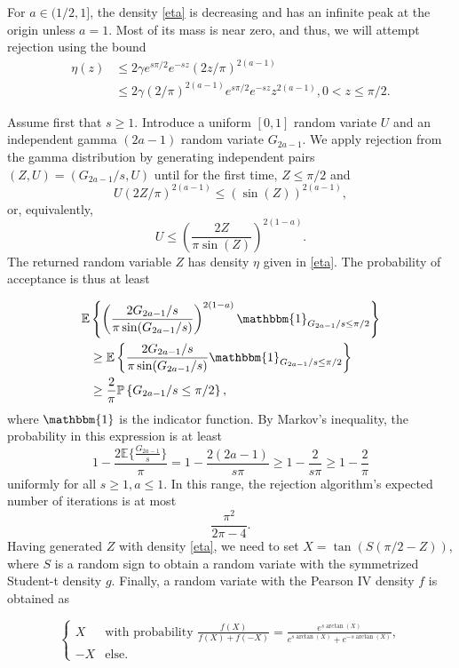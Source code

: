 \documentclass[12pt,reqno,tbtags]{amsart}
\newcommand{\I}{\mathbbm{1}}
\newcommand{\EXP}{\mathbb{E}}
\newcommand{\PROB}{\mathbb{P}}
\begin{document}
For $a \in (1/2,1]$,  the density \eqref{eta}
is decreasing and has an infinite peak at the origin unless $a=1$.
Most of its mass is near zero, and thus, we will attempt rejection using the bound
\begin{align*} 
\eta (z) &\le 2\gamma e^{s\pi/2} e^{-sz} (2z/\pi)^{2(a-1)}  \\
&\le 2\gamma (2/\pi)^{2(a-1)} e^{s\pi/2} e^{-sz} z^{2(a-1)} ,  0 < z \le \pi/2.
\end{align*}

Assume first that $s \ge 1$.
Introduce a uniform $[0,1]$ random variate $U$ and an independent  gamma $(2a-1)$
random variate $G_{2a-1}$.
We apply rejection from the gamma distribution by generating
independent pairs $(Z,U) = (G_{2a-1}/s , U)$ until for the first time,
$Z \le \pi/2$ and
$$
U  (2Z/\pi)^{2(a-1)} \le (\sin (Z))^{2(a-1)},
$$
or, equivalently,
$$
U \le \left( \frac{ 2Z }{ \pi \sin (Z)} \right)^{2(1-a)}.
$$
The returned random variable $Z$ has density $\eta$ given in \eqref{eta}.
The probability of acceptance is thus at least

\begin{align*} 
\EXP &\left\{ \left( \frac{ 2G_{2a-1}/s }{ \pi \sin (G_{2a-1}/s)} \right)^{2(1-a)}  \I_{G_{2a-1}/s \le \pi/2} \right\} \\
&\ge \EXP \left\{ \frac{ 2G_{2a-1}/s }{ \pi \sin (G_{2a-1}/s)}  \I_{G_{2a-1}/s \le \pi/2} \right\} \\
&\ge \frac{2 }{ \pi}  \PROB \left\{ G_{2a-1}/s \le \pi/2 \right\}, 
\end{align*}
where $\I$ is the indicator function. By Markov's inequality, the probability in this expression is at least
$$
1 - \frac{2 \EXP \{ \frac{G_{2a-1} }{ s} \} }{  \pi} = 1 - \frac{2 (2a-1) }{ s \pi}
\ge 1 - \frac{2 }{ s \pi} 
\ge 1 - \frac{2 }{ \pi} 
$$
uniformly for all $s \ge 1, a \le 1$. In this range, the rejection algorithm's expected number of iterations is at most 
$$
\frac{ \pi^2 }{ 2\pi - 4 }.
$$
Having generated $Z$ with density \eqref{eta}, we need to set 
$X = \tan ( S(\pi/2 -Z) )$, where $S$ is a random sign to obtain 
a random variate with the symmetrized Student-t density $g$.
Finally, a random variate with the Pearson IV density $f$ is obtained as

\begin{equation*}
\begin{cases}
X & \text{with probability } \frac{f(X) }{ f(X)+f(-X)} 
= \frac{ e^{s \arctan (X)}  }{ e^{s \arctan (X)} + e^{-s \arctan (X)}},  \\
-X & \text{else.} 
\end{cases}
\end{equation*}
\end{document}
